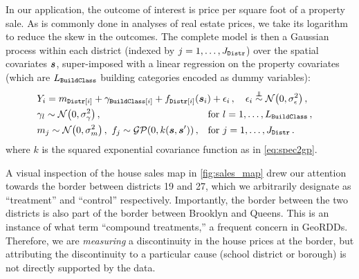 In our application, the outcome of interest is price per square foot of a property sale.
As is commonly done in analyses of real estate prices, we take its logarithm to reduce the skew in the outcomes.
The complete model is then a Gaussian process within each district (indexed by \(j=1,\dotsc,J_{\mathtt{Distr}}\)) over the spatial covariates \(\bm{s}\), super-imposed with a linear regression on the property covariates (which are \(L_{\mathtt{BuildClass}}\) building categories encoded as dummy variables):
\begin{equation}
    \begin{aligned}
        & Y_i = %
            m_{\district\sbr{i}} + \gamma_{\building\sbr{i}}
            + f_{\district\sbr{i}}(\svec_i) + \epsilon_i 
            \,,\quad
             \epsilon_i \overset{\indep}{\sim} \normal\del{0, \sigman^2} 
            \,,
            \phantom{\hspace{-10cm}} %
            \\
        & \gamma_{l} \sim \normal\del{0, \sigmabeta^2}
            \,,
            &&
            \text{for }
            l=1,\dotsc,L_\building \,, \\
        & m_{j} \sim \normal\del{0, \sigmamu^2}
        \,,\ 
        f_j \sim \GP\del{0, k(\svec, \svec')}
            \,,
            &&
            \text{for }
            j=1,\dotsc,J_\district
        \,.
    \end{aligned}
    \label{eq:nyc_model}
\end{equation}
where \(k\) is the squared exponential covariance function as in \autoref{eq:spec2gp}.

A visual inspection of the house sales map in \autoref{fig:sales_map} drew our attention towards the border between districts 19 and 27, which we arbitrarily designate as ``treatment'' and ``control'' respectively.
Importantly, the border between the two districts is also part of the border between Brooklyn and Queens.
This is an instance of what \citet{keele_titiunik_2015} term ``compound treatments,'' a frequent concern in GeoRDDs.
Therefore, we are \emph{measuring} a discontinuity in the house prices at the border,
but attributing the discontinuity to a particular cause (school district or borough) is not directly supported by the data.

